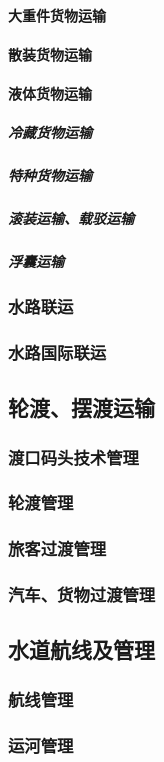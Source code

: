 \documentclass[UTF8]{../ApplicationUniverse}
\begin{document}
            \paragraph{大重件货物运输}
            \paragraph{散装货物运输}
            \paragraph{液体货物运输}
                \subparagraph{冷藏货物运输}
                \subparagraph{特种货物运输}
                \subparagraph{滚装运输、载驳运输}
                \subparagraph{浮囊运输}
        \subsubsection{水路联运}
        \subsubsection{水路国际联运}
    \subsection{轮渡、摆渡运输}
        \subsubsection{渡口码头技术管理}
        \subsubsection{轮渡管理}
        \subsubsection{旅客过渡管理}
        \subsubsection{汽车、货物过渡管理}
    \subsection{水道航线及管理}
        \subsubsection{航线管理}
        \subsubsection{运河管理}
\end{document}
